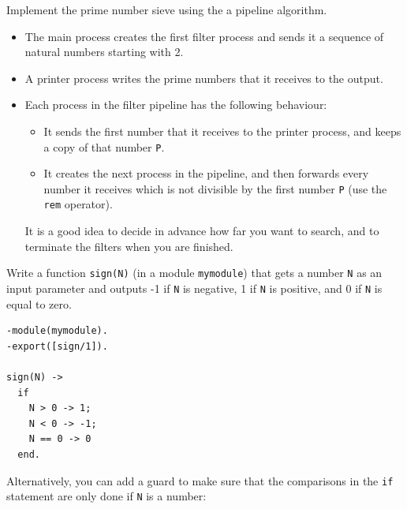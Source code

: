 \documentclass[12pt]{exam}
\begin{document}
\begin{questions}

\question
Implement the prime number sieve using the a pipeline algorithm.
\begin{itemize}
\item
The main process creates the first filter process and sends it a sequence of natural numbers starting with 2.
\item
A printer process writes the prime numbers that it receives to the output.
\item
Each process in the filter pipeline has the following behaviour: 
\begin{itemize}
\item
It sends the first number that it receives to the printer process, and keeps a copy of that number \texttt{P}. 
\item
It creates the next process in the pipeline, and then forwards every number 
it receives which is not divisible by the first number \texttt{P} (use the \texttt{rem} operator).
\end{itemize}
It is a good idea to decide in advance how far you want to search, and to terminate the filters when you are finished.
\end{itemize}

\question
Write a function \texttt{sign(N)} (in a module \texttt{mymodule})
that gets a number \texttt{N} as an input parameter and outputs
-1 if \texttt{N} is negative, 1 if \texttt{N} is positive, and
0 if \texttt{N} is equal to zero.

\begin{solutionorbox}
\begin{verbatim}
-module(mymodule).
-export([sign/1]).

sign(N) -> 
  if 
    N > 0 -> 1;
    N < 0 -> -1;
    N == 0 -> 0
  end.
\end{verbatim}

Alternatively, you can add a guard to make sure that the
comparisons in the \texttt{if} statement are only done if
\texttt{N} is a number:


\end{solutionorbox}
\end{questions}
\end{document}
